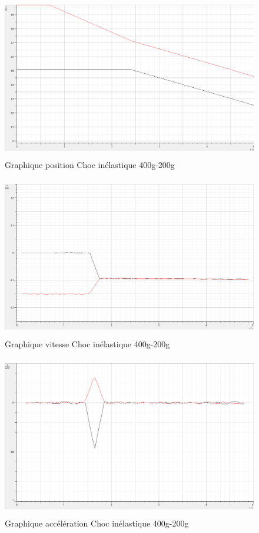 \newpage

\begin{figure}[h]
    \caption[Graphique position Choc inélastique 400g-200g]{Graphique position Choc inélastique 400g-200g}
    \centering
    \includegraphics[height=19em]{Data/400-200inela01.png}
\end{figure}

\begin{figure}[h]
    \caption[Graphique vitesse Choc inélastique 400g-200g]{Graphique vitesse Choc inélastique 400g-200g}
    \centering
    \includegraphics[height=19em]{Data/400-200inela02v.png}
\end{figure}

\newpage

\begin{figure}[h]
    \caption[Graphique accélération Choc inélastique 400g-200g]{Graphique accélération Choc inélastique 400g-200g}
    \centering
    \includegraphics[height=19em]{Data/400-200inela02a.png}
\end{figure}

